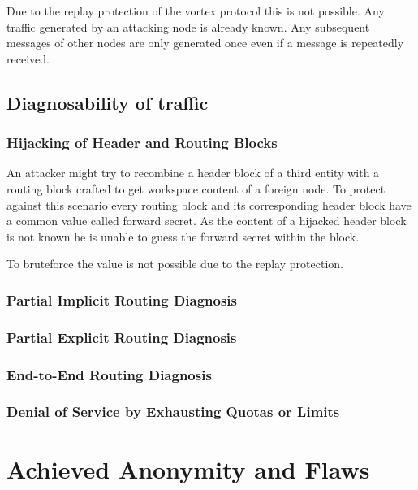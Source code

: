 Due to the replay protection of the vortex protocol this is not possible. Any traffic generated by an attacking node is already known. Any subsequent messages of other nodes are only generated once even if a message is repeatedly received.

\subsection{Diagnosability of traffic}

\subsubsection{Hijacking of Header and Routing Blocks}
An attacker might try to recombine a header block of a third entity with a routing block crafted to get workspace content of a foreign node. To protect against this scenario every routing block and its corresponding header block have a common value called forward secret. As the content of a hijacked header block is not known he is unable to guess the forward secret within the block.

To bruteforce the value is not possible due to the replay protection. 
\subsubsection{Partial Implicit Routing Diagnosis}

\subsubsection{Partial Explicit Routing Diagnosis}

\subsubsection{End-to-End Routing Diagnosis}

\subsubsection{Denial of Service by Exhausting Quotas or Limits}

\section{Achieved Anonymity and Flaws}
